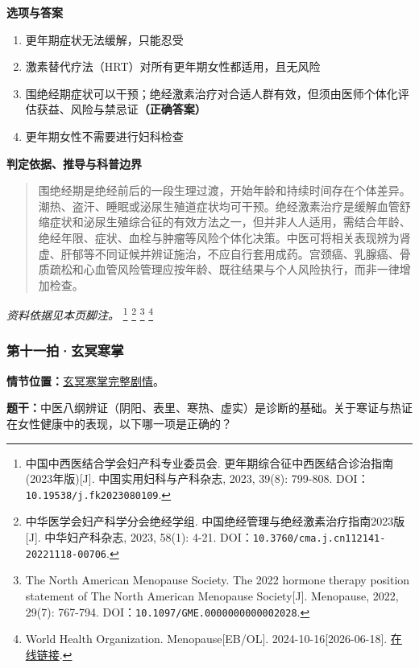 \textbf{选项与答案}
\begin{enumerate}[label=\Alph*.,leftmargin=*]
  \item 更年期症状无法缓解，只能忍受
  \item 激素替代疗法（HRT）对所有更年期女性都适用，且无风险
  \item 围绝经期症状可以干预；绝经激素治疗对合适人群有效，但须由医师个体化评估获益、风险与禁忌证\textbf{（正确答案）}
  \item 更年期女性不需要进行妇科检查
\end{enumerate}
\textbf{判定依据、推导与科普边界}
\begin{quote}围绝经期是绝经前后的一段生理过渡，开始年龄和持续时间存在个体差异。潮热、盗汗、睡眠或泌尿生殖道症状均可干预。绝经激素治疗是缓解血管舒缩症状和泌尿生殖综合征的有效方法之一，但并非人人适用，需结合年龄、绝经年限、症状、血栓与肿瘤等风险个体化决策。中医可将相关表现辨为肾虚、肝郁等不同证候并辨证施治，不应自行套用成药。宫颈癌、乳腺癌、骨质疏松和心血管风险管理应按年龄、既往结果与个人风险执行，而非一律增加检查。\end{quote}
\noindent\textit{资料依据见本页脚注。}
\footnote{中国中西医结合学会妇产科专业委员会. 更年期综合征中西医结合诊治指南(2023年版)[J]. 中国实用妇科与产科杂志, 2023, 39(8): 799-808. DOI：\nolinkurl{10.19538/j.fk2023080109}.}
\footnote{中华医学会妇产科学分会绝经学组. 中国绝经管理与绝经激素治疗指南2023版[J]. 中华妇产科杂志, 2023, 58(1): 4-21. DOI：\nolinkurl{10.3760/cma.j.cn112141-20221118-00706}.}
\footnote{The North American Menopause Society. The 2022 hormone therapy position statement of The North American Menopause Society[J]. Menopause, 2022, 29(7): 767-794. DOI：\nolinkurl{10.1097/GME.0000000000002028}.}
\footnote{World Health Organization. Menopause[EB/OL]. 2024-10-16[2026-06-18]. \href{https://www.who.int/news-room/fact-sheets/detail/menopause}{在线链接}.}

\subsubsection{第十一拍·玄冥寒掌}\label{question:zhaomin:11}
\textbf{情节位置：}\hyperref[plot:zhaomin:11]{玄冥寒掌完整剧情}。

\textbf{题干：}中医八纲辨证（阴阳、表里、寒热、虚实）是诊断的基础。关于寒证与热证在女性健康中的表现，以下哪一项是正确的？

